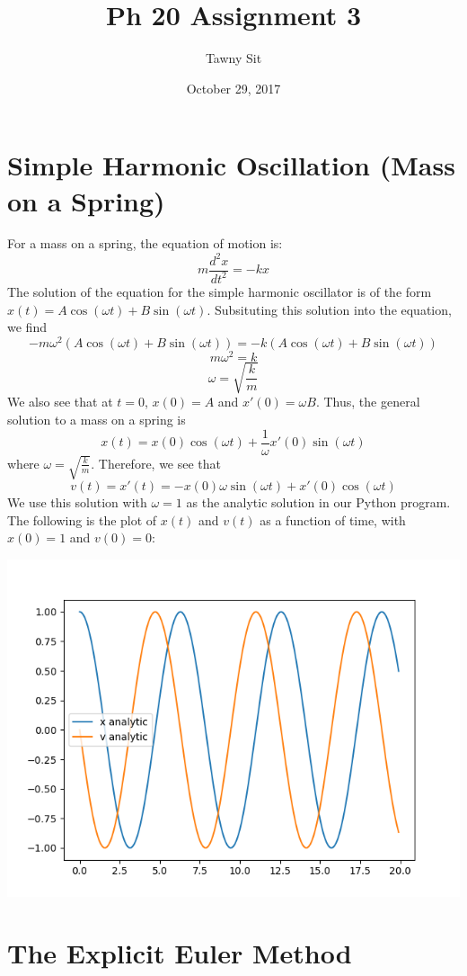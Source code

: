 \documentclass{article}
\title{Ph 20 Assignment 3}
\author{Tawny Sit}
\date{October 29, 2017}
\begin{document}
\maketitle

\section{Simple Harmonic Oscillation (Mass on a Spring)}
For a mass on a spring, the equation of motion is:
$$  m\frac{d^2x}{dt^2} = -kx $$
The solution of the equation for the simple harmonic oscillator is of the form $x(t) = A\cos(\omega t) + B\sin(\omega t)$. Subsituting this solution into the equation, we find
$$ -m\omega^2(A\cos(\omega t) + B\sin(\omega t)) = -k(A\cos(\omega t) + B\sin(\omega t)) $$
$$ m\omega^2 = k $$
$$ \omega = \sqrt{\frac{k}{m}}$$
We also see that at $t=0$, $x(0) = A$ and $x'(0) = \omega B$. Thus, the general solution to a mass on a spring is
$$ x(t) = x(0)\cos(\omega t) + \frac{1}{\omega}x'(0)\sin(\omega t) $$
where $\omega = \sqrt{\frac{k}{m}}$. Therefore, we see that
$$v(t) = x'(t) = -x(0)\omega\sin(\omega t) + x'(0)\cos(\omega t)$$
We use this solution with $ \omega = 1 $ as the analytic solution in our Python program. The following is the plot of $x(t)$ and $v(t)$ as a function of time, with $ x(0) = 1 $ and $ v(0) = 0 $:

\includegraphics[scale=0.9]{images/analytic_solution.png}

\section{The Explicit Euler Method}
\end{document}
